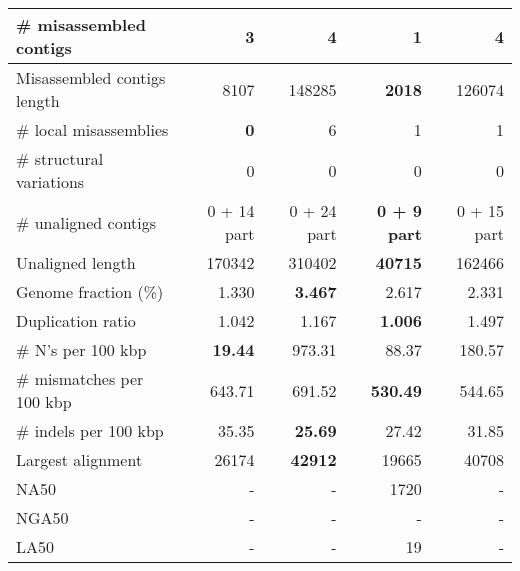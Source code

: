 \documentclass[12pt,a4paper]{article}
\begin{document}
\begin{table}[ht]
\begin{center}
\begin{tabular}{|l*{4}{|r}|}
\# misassembled contigs & 3 & 4 & {\bf 1} & 4 \\ \hline
Misassembled contigs length & 8107 & 148285 & {\bf 2018} & 126074 \\ \hline
\# local misassemblies & {\bf 0} & 6 & 1 & 1 \\ \hline
\# structural variations & 0 & 0 & 0 & 0 \\ \hline
\# unaligned contigs & 0 + 14 part & 0 + 24 part & {\bf 0 + 9 part} & 0 + 15 part \\ \hline
Unaligned length & 170342 & 310402 & {\bf 40715} & 162466 \\ \hline
Genome fraction (\%) & 1.330 & {\bf 3.467} & 2.617 & 2.331 \\ \hline
Duplication ratio & 1.042 & 1.167 & {\bf 1.006} & 1.497 \\ \hline
\# N's per 100 kbp & {\bf 19.44} & 973.31 & 88.37 & 180.57 \\ \hline
\# mismatches per 100 kbp & 643.71 & 691.52 & {\bf 530.49} & 544.65 \\ \hline
\# indels per 100 kbp & 35.35 & {\bf 25.69} & 27.42 & 31.85 \\ \hline
Largest alignment & 26174 & {\bf 42912} & 19665 & 40708 \\ \hline
NA50 & - & - & 1720 & - \\ \hline
NGA50 & - & - & - & - \\ \hline
LA50 & - & - & 19 & - \\ \hline
\end{tabular}
\end{center}
\end{table}
\end{document}
